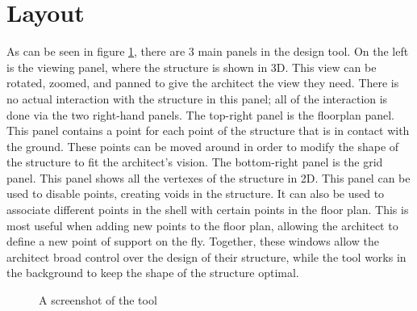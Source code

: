 \documentclass{thesis}
\begin{document}
\section{Layout}
As can be seen in figure \ref{FIGURE_screenshot}, there are 3 main panels in the design tool.  On the left is the viewing panel, where the structure
is shown in 3D.  This view can be rotated, zoomed, and panned to give the architect the view they need.  There is no actual interaction with the
structure in this panel; all of the interaction is done via the two right-hand panels.  The top-right panel is the floorplan panel.  This panel
contains a point for each point of the structure that is in contact with the ground.  These points can be moved around in order to modify the shape
of the structure to fit the architect's vision.  The bottom-right panel is the grid panel.  This panel shows all the vertexes of the structure in 2D.
This panel can be used to disable points, creating voids in the structure.  It can also be used to associate different points in the shell with certain
points in the floor plan.  This is most useful when adding new points to the floor plan, allowing the architect to define a new point of support on the
fly.  Together, these windows allow the architect broad control over the design of their structure, while the tool works in the background to keep the
shape of the structure optimal.
\begin{figure}
\caption{A screenshot of the tool}
\label{FIGURE_screenshot}
\end{figure}
\end{document}
